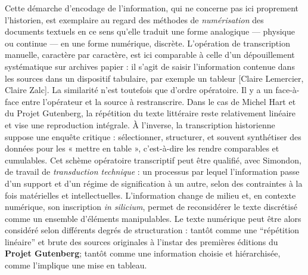 Cette démarche d'encodage de l'information, qui ne concerne pas ici proprement l’historien, est exemplaire au regard des méthodes de \emph{numérisation} des documents textuels en ce sens qu’elle traduit une forme analogique — physique ou continue — en une forme numérique, discrète. L’opération de transcription manuelle, caractère par caractère, est ici comparable à celle d’un dépouillement systématique sur archives papier : il s’agit de saisir l’information contenue dans les sources dans un dispositif tabulaire, par exemple un tableur [Claire Lemercier, Claire Zalc]. La similarité n’est toutefois que d’ordre opératoire. Il y a un face-à-face entre l'opérateur et la source à restranscrire. Dans le cas de Michel Hart et du Projet Gutenberg, la répétition du texte littéraire reste relativement linéaire et vise une reproduction intégrale. À l’inverse, la transcription historienne suppose une enquête critique : sélectionner, structurer, et souvent synthétiser des données pour les « mettre en table », c’est-à-dire les rendre comparables et cumulables. Cet schème opératoire transcriptif peut être qualifié, avec Simondon, de travail de \emph{transduction technique} : un processus par lequel l’information passe d’un support et d’un régime de signification à un autre, selon des contraintes à la fois matérielles et intellectuelles. L'information change de milieu et, en contexte numérique, son inscription \emph{in silicium}, permet de reconsidérer le texte discrétisé comme un ensemble d'éléments manipulables. Le texte numérique peut être alors considéré selon différents degrés de structuration : tantôt comme une \enquote{répétition linéaire} et brute des sources originales à l'instar des premières éditions du \textbf{Projet Gutenberg}; tantôt comme une information choisie et hiérarchisée, comme l'implique une mise en tableau.

